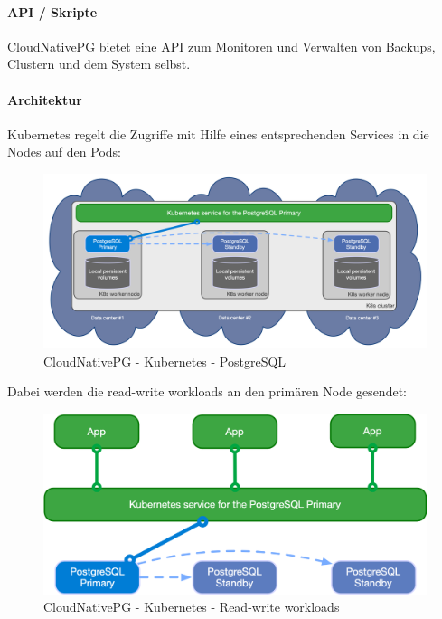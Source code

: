 \begin{flushleft}
    \paragraph{API / Skripte}
    CloudNativePG bietet eine API zum Monitoren und Verwalten von Backups, Clustern und dem System selbst\cite{LY8V4XQM}.
\end{flushleft}
\begin{flushleft}
    \paragraph{Architektur}
    Kubernetes regelt die Zugriffe mit Hilfe eines entsprechenden Services in die Nodes auf den Pods:
    \begin{figure}[H]
        \centering
        \includegraphics[width=0.75\linewidth]{source/implementation/evaluation/postgresql_ha_solutions/cloudnativepg/k8s-pg-architecture}
        \caption{CloudNativePG - Kubernetes - PostgreSQL}
        \label{fig:k8s-pg-architecture}
    \end{figure}
\end{flushleft}
\begin{flushleft}
    Dabei werden die read-write workloads an den primären Node gesendet:
    \begin{figure}[H]
        \centering
        \includegraphics[width=0.75\linewidth]{source/implementation/evaluation/postgresql_ha_solutions/cloudnativepg/cloudnativepg-architecture-rw}
        \caption{CloudNativePG - Kubernetes - Read-write workloads}
        \label{fig:cloudnativepg-architecture-rw}
    \end{figure}
\end{flushleft}
